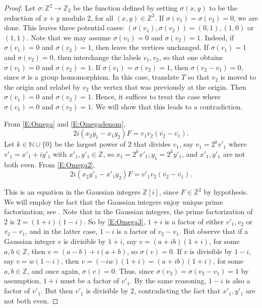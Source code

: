 \documentclass[10pt,preprint]{amsart}
\def\N{\mathbb N}
\def\Z{\mathbb Z}
\theoremstyle{plain}
\theoremstyle{definition}
\theoremstyle{remark}
\begin{document}
\begin{proof} Let $\sigma:\Z^2\to\Z_2$ be the function defined by setting $\sigma(x,y)$ to be the reduction of $x+y$ modulo $2$,  for all $(x,y)\in\Z^2$. 
If $\sigma(v_1) = \sigma(v_2) = 0$, we are done. This leaves three potential cases: $(\sigma(v_1),\sigma(v_2)) = (0,1), (1,0)$ or $(1,1)$. Note that we may assume $\sigma(v_1) = 0$ and $\sigma(v_2) = 1$. 
Indeed, if $\sigma(v_1) = 0$ and $\sigma(v_2) = 1$, then leave the vertices unchanged.
If $\sigma(v_1) = 1$ and $\sigma(v_2) = 0$, then interchange the labels $v_1,v_2$, so that one obtains $\sigma(v_1) = 0$ and $\sigma(v_2) = 1$.
If $\sigma(v_1) = \sigma(v_2) = 1$, then $\sigma(v_2-v_1)=0$, since $\sigma$ is a group homomorphism. In this case, translate $T$ so that $v_2$ is moved to the origin and relabel by $v_2$ the vertex that was previously at the origin. Then $\sigma(v_1)=0$ and $\sigma(v_2)=1$. Hence, it suffices to treat the case where $\sigma(v_1)=0$ and $\sigma(v_2)=1$. We will show that this leads to a contradiction.

From \eqref{E:Omega} and \eqref{E:Omegadenom}, 
\begin{equation}\label{E:Omega2}
2i(x_2 y_1 - x_1 y_2)F=v_1v_2(\overline{v_2}-\overline{v_1}).
\end{equation}
Let $k\in\N\cup\{0\}$ be the largest power of $2$ that divides $v_1$, say $v_1=2^kv'_1$ where $v'_1=x'_1+iy'_1$ with $x'_1,y'_1\in\Z$, so $x_1=2^kx'_1,y_1=2^ky'_1$, and $x'_1,y'_1$ are not both even. From \eqref{E:Omega2}, 
\begin{equation}\label{E:Omega3}
2i(x_2 y'_1 - x'_1 y_2)F=v'_1v_2(\overline{v_2}-\overline{v_1}).
\end{equation}

This is an equation in the Gaussian integers $\Z[i]$,  
since $F\in \Z^2$ by hypothesis. We will employ the fact that the Gaussian integers enjoy unique prime factorization; see \cite[Chapter~7]{Stillwell}.
Note that in the Gaussian integers, the prime factorization of $2$ is $2=(1+i)(1-i)$. So by  \eqref{E:Omega3}, $1+i$ is a factor of either $v'_1,v_2$ or $\overline{v_2}-\overline{v_1}$, and in the latter case, $1-i$ is a factor of  $v_2- v_1$.
But observe that if a Gaussian integer $v$ is divisible by $1+i$, say $v=(a+ib)(1+i)$, for some $a,b\in\Z$, then $v=(a-b)+i(a+b)$, so $\sigma(v)=0$. 
If $v$ is divisible by $1-i$, say $v=w(1-i)$, then $v=(-iw)(1+i)=(a+ib)(1+i)$, for some $a,b\in\Z$, and once again, $\sigma(v)=0$. Thus, since $\sigma(v_2)=\sigma(v_2-v_1)=1$ by assumption, $1+i$ must be a factor of $v'_1$. By the same reasoning, $1-i$ is also a factor of $v'_1$. But then $v'_1$ is divisible by $2$, contradicting the fact that $x'_1,y'_1$ are not both even.
\end{proof}
\end{document}
